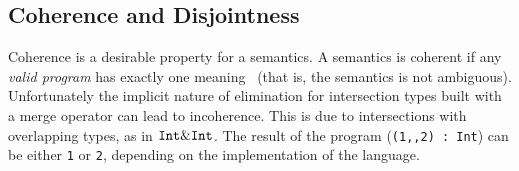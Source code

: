\begin{comment}
\paragraph{Merge vs Pairs}
The significant difference between intersection types with a
merge operator and regular pairs is in the elimination construct. 
With pairs there are explicit eliminators (\lstinline{fst} and
\lstinline{snd}), and these eliminators must be used to extract the
components of the right type.
With intersection types and a merge operator, eliminators are implicit in the language,
meaning no uses of projection functions are necessary.
\end{comment}






\subsection{Coherence and Disjointness}
\label{subsec:coherence}
Coherence is a desirable property for a semantics. 
A semantics is coherent if any \emph{valid program} has exactly one
meaning~\cite{reynolds1991coherence} (that is, the semantics is not ambiguous).
Unfortunately the implicit nature of elimination for intersection
types built with a merge operator can lead to incoherence.
This is due to intersections with overlapping types, as in
$\texttt{Int} \& \texttt{Int}$.
The result of the program (\lstinline$(1,,2) : Int$)
can be either \lstinline$1$ or \lstinline$2$, depending on the implementation 
of the language.

